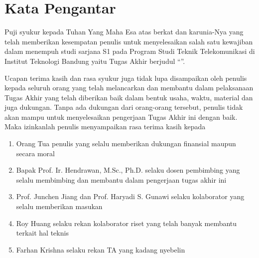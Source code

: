 \chapter*{Kata Pengantar}


Puji syukur kepada Tuhan Yang Maha Esa atas berkat dan karunia-Nya yang telah
memberikan kesempatan penulis untuk menyelesaikan salah satu kewajiban dalam
menempuh studi sarjana S1 pada Program Studi Teknik Telekomunikasi di Institut
Teknologi Bandung yaitu Tugas Akhir berjudul “\textbf{\thetitle}”.

Ucapan terima kasih dan rasa syukur juga tidak lupa disampaikan oleh penulis
kepada seluruh orang yang telah melancarkan dan membantu dalam pelaksanaan
Tugas Akhir yang telah diberikan baik dalam bentuk usaha, waktu, material dan
juga dukungan. Tanpa ada dukungan dari orang-orang tersebut, penulis tidak akan
mampu untuk menyelesaikan pengerjaan Tugas Akhir ini dengan baik. Maka
izinkanlah penulis menyampaikan rasa terima kasih kepada

\begin{enumerate}
    \item Orang Tua penulis yang selalu memberikan dukungan finansial maupun secara moral
    \item Bapak Prof. Ir. Hendrawan, M.Sc., Ph.D. selaku dosen pembimbing yang selalu membimbing dan membantu dalam pengerjaan tugas akhir ini
    \item Prof. Junchen Jiang dan Prof. Haryadi S. Gunawi selaku kolaborator yang selalu memberikan masukan
    \item Roy Huang selaku rekan kolaborator riset yang telah banyak membantu terkait hal teknis 
    \item Farhan Krishna selaku rekan TA yang kadang nyebelin
\end{enumerate}

